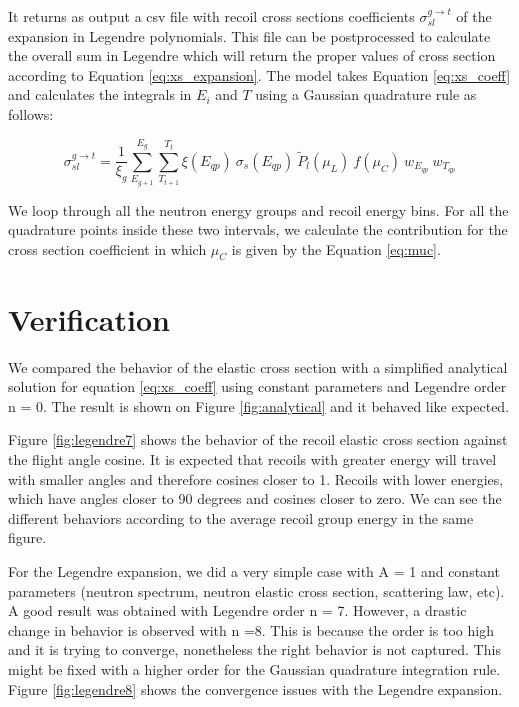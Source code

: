 \documentclass[review]{elsarticle}
\begin{document}
It returns as output a csv file with recoil cross sections coefficients ${\sigma}_{sl}^{g \rightarrow t}$ of the expansion in Legendre polynomials. This file can be postprocessed to calculate the overall sum in Legendre which will return the proper values of cross section according to Equation \ref{eq:xs_expansion}. The model takes Equation \ref{eq:xs_coeff} and calculates the integrals in $E_i$ and $T$ using a Gaussian quadrature rule as follows:

\begin{equation}
	{\sigma}_{sl}^{g \rightarrow t} = \frac{1}{\xi_g}  \sum\limits_{E_{g+1}}^{E_g}  \sum\limits_{{T}_{t+1}}^{T_t} \xi (E_{qp}) \  \sigma_s (E_{qp})  \ \tilde P_l \left( \mu_L\right) \ 	f(\mu_C) \ w_{E_{qp}} \ w_{T_{qp}}
	\label{eq:xs_num}
\end{equation}

We loop through all the neutron energy groups and recoil energy bins. For all the quadrature points inside these two intervals, we calculate the contribution for the cross section coefficient in which $\mu_C$ is given by the Equation \ref{eq:muc}. 


\section{Verification}

We compared the behavior of the elastic cross section with a simplified analytical solution for equation \ref{eq:xs_coeff} using constant parameters and Legendre order n = 0. The result is shown on Figure \ref{fig:analytical} and it behaved like expected. 

Figure \ref{fig:legendre7} shows the behavior of the recoil elastic cross section against the flight angle cosine. It is expected that recoils with greater energy will travel with smaller angles and therefore cosines closer to 1. Recoils with lower energies, which have angles closer to 90 degrees and cosines closer to zero. We can see the different behaviors according to the average recoil group energy in the same figure.

For the Legendre expansion, we did a very simple case with A = 1 and constant parameters (neutron spectrum, neutron elastic cross section, scattering law, etc). A good result was obtained with Legendre order n = 7. However, a drastic change in behavior is observed with n =8. This is because the order is too high and it is trying to converge, nonetheless the right behavior is not captured. This might be fixed with a higher order for the Gaussian quadrature integration rule. Figure \ref{fig:legendre8} shows the convergence issues with the Legendre expansion. 
\end{document}

